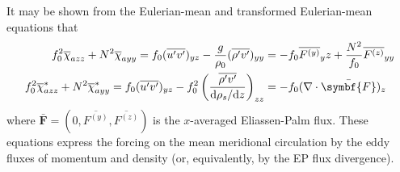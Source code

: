 \documentclass{jknotes}
\begin{document}
It may be shown from the Eulerian-mean and transformed Eulerian-mean equations
that
\begin{align}
	f_0^2 \overline{\chi}_{azz} + N^2 \overline{\chi}_{ayy} = f_0
	(\overline{u'v'})_{yz} - \frac{g}{\rho_0} (\overline{\rho'v'})_{yy} &= -f_0
	\overline{F^{(y)}}_yz + \frac{N^2}{f_0} \overline{F^{(z)}}_{yy}
	\label{eq:mmc_eul}\\
	f_0^2 \overline{\chi}_{azz}^* + N^2 \overline{\chi}_{ayy}^* = f_0
	(\overline{u'v'})_{yz} - f_0^2 \left( \frac{\overline{\rho'v'}}{\diffd
			\rho_s / \diffd z}\right)_{zz} &= -f_0 (\nabla \cdot
			\bar{\symbf{F}})_z\label{eq:mmc_teul}
\end{align}
where $\symbf{\bar{F}} = (0, \overline{F^{(y)}}, \overline{F^{(z)}})$ is
the $x$-averaged Eliassen-Palm flux. These equations express the forcing on
the mean meridional circulation by the eddy fluxes of momentum and density
(or, equivalently, by the EP flux divergence).
\end{document}
